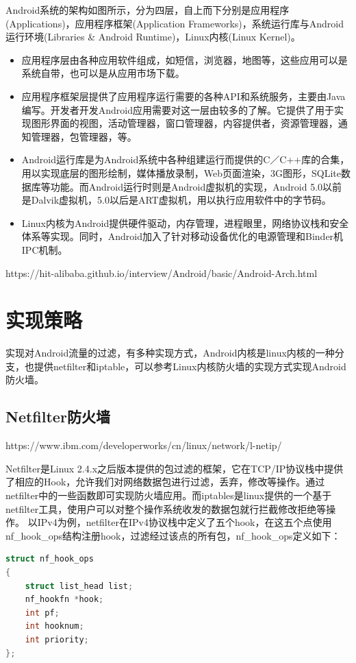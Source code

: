 \documentclass[format=final, language=chinese, degree=bachelor]{hustthesis}
\begin{document}
Android系统的架构如图所示，分为四层，自上而下分别是应用程序(Applications)，应用程序框架(Application Frameworks)，系统运行库与Android运行环境(Libraries \& Android Runtime)，Linux内核(Linux Kernel)。
\begin{itemize}
\item 应用程序层由各种应用软件组成，如短信，浏览器，地图等，这些应用可以是系统自带，也可以是从应用市场下载。
\item 应用程序框架层提供了应用程序运行需要的各种API和系统服务，主要由Java编写。开发者开发Android应用需要对这一层由较多的了解。它提供了用于实现图形界面的视图，活动管理器，窗口管理器，内容提供者，资源管理器，通知管理器，包管理器，等。
\item Android运行库是为Android系统中各种组建运行而提供的C／C++库的合集，用以实现底层的图形绘制，媒体播放录制，Web页面渲染，3G图形，SQLite数据库等功能。而Android运行时则是Android虚拟机的实现，Android 5.0以前是Dalvik虚拟机，5.0以后是ART虚拟机，用以执行应用软件中的字节码。
\item Linux内核为Android提供硬件驱动，内存管理，进程眼里，网络协议栈和安全体系等实现。同时，Android加入了针对移动设备优化的电源管理和Binder机IPC机制。
\end{itemize}
https://hit-alibaba.github.io/interview/Android/basic/Android-Arch.html

\section{实现策略}
实现对Android流量的过滤，有多种实现方式，Android内核是linux内核的一种分支，也提供netfilter和iptable，可以参考Linux内核防火墙的实现方式实现Android防火墙。

\subsection{Netfilter防火墙}

https://www.ibm.com/developerworks/cn/linux/network/l-netip/

Netfilter是Linux 2.4.x之后版本提供的包过滤的框架，它在TCP/IP协议栈中提供了相应的Hook，允许我们对网络数据包进行过滤，丢弃，修改等操作。通过netfilter中的一些函数即可实现防火墙应用。而iptables是linux提供的一个基于netfilter工具，使用户可以对整个操作系统收发的数据包就行拦截修改拒绝等操作。
以IPv4为例，netfilter在IPv4协议栈中定义了五个hook，在这五个点使用nf\_hook\_ops结构注册hook，过滤经过该点的所有包，nf\_hook\_ops定义如下：

\begin{lstlisting}[language=c]
struct nf_hook_ops
{
    struct list_head list;
    nf_hookfn *hook;
    int pf;
    int hooknum;
    int priority;
};
\end{lstlisting}
\end{document}
